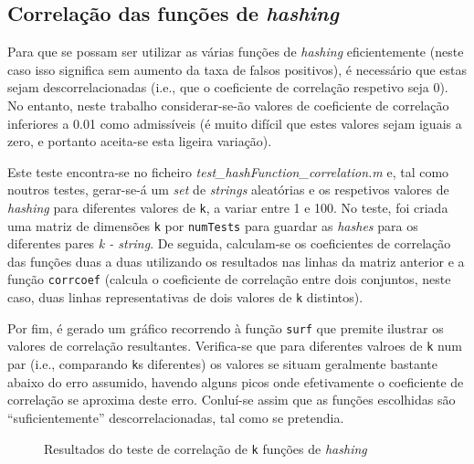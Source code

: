 \documentclass[a4paper,11pt,openright,oneside]{report}
\begin{document}
\subsection{Correlação das funções de \textit{hashing}}
\label{subsec.hashcorr}

Para que se possam ser utilizar as várias funções de \textit{hashing} eficientemente (neste caso isso significa sem aumento da taxa de falsos positivos), é necessário que estas sejam descorrelacionadas (i.e., que o coeficiente de correlação respetivo seja 0). No entanto, neste trabalho considerar-se-ão valores de coeficiente de correlação inferiores a 0.01 como admissíveis (é muito difícil que estes valores sejam iguais a zero, e portanto aceita-se esta ligeira variação).

Este teste encontra-se no ficheiro \textit{test\_hashFunction\_correlation.m} e, tal como noutros testes, gerar-se-á um \textit{set} de \textit{strings} aleatórias e os respetivos valores de \textit{hashing} para diferentes valores de \texttt{k}, a variar entre 1 e 100. No teste, foi criada uma matriz de dimensões \texttt{k} por \texttt{numTests} para guardar as \textit{hashes} para os diferentes pares \textit{k - string}. De seguida, calculam-se os coeficientes de correlação das funções duas a duas utilizando os resultados nas linhas da matriz anterior e a função \texttt{corrcoef} (calcula o coeficiente de correlação entre dois conjuntos, neste caso, duas linhas representativas de dois valores de \texttt{k} distintos).

Por fim, é gerado um gráfico recorrendo à função \texttt{surf} que premite ilustrar os valores de correlação resultantes. Verifica-se que para diferentes valroes de \texttt{k} num par (i.e., comparando \texttt{k}s diferentes) os valores se situam geralmente bastante abaixo do erro assumido, havendo alguns picos onde efetivamente o coeficiente de correlação se aproxima deste erro. Conluí-se assim que as funções escolhidas são ``suficientemente'' descorrelacionadas, tal como se pretendia.

\begin{figure}[ht]
\center
{}
\caption{Resultados do teste de correlação de \texttt{k} funções de \textit{hashing}}
\label{fig:hashcorr}
\end{figure}
\end{document}
